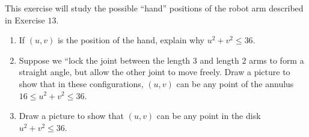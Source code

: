 \begin{exercise}{14}
This exercise will study the possible ``hand'' positions of the robot arm described in Exercise $13$.
\begin{enumerate}
    \item If $(u,v)$ is the position of the hand, explain why $u^2 + v^2 \leq 36$.
    \item Suppose we ``lock the joint between the length $3$ and length $2$ arms to form a straight angle, but allow the other joint to move freely. Draw a picture to show that in these configurations, $(u,v)$ can be any point of the annulus $16\leq u^2 + v^2 \leq 36$.
    \item Draw a picture to show that $(u,v)$ can be any point in the disk $u^2 + v^2\leq 36$.
\end{enumerate}
\end{exercise}
